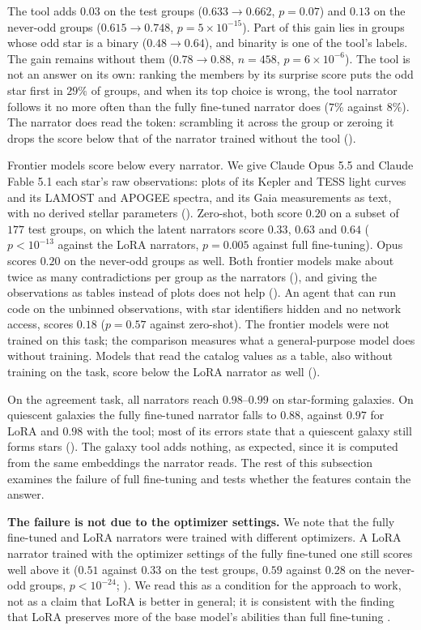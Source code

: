 The tool adds $0.03$ on the test groups ($0.633 \to 0.662$, $p=0.07$) and $0.13$ on the
never-odd groups ($0.615 \to 0.748$, $p=5\times10^{-15}$). Part of this gain lies in groups
whose odd star is a binary ($0.48 \to 0.64$), and binarity is one of the tool's labels. The
gain remains without them ($0.78 \to 0.88$, $n=458$, $p=6\times10^{-6}$). The tool is not an
answer on its own: ranking the members by its surprise score puts the odd star first in $29\%$
of groups, and when its top choice is wrong, the tool narrator follows it no more often than
the fully fine-tuned narrator does ($7\%$ against $8\%$). The narrator does read the token:
scrambling it across the group or zeroing it drops the score below that of the narrator trained
without the tool ().

Frontier models score below every narrator. We give Claude Opus 5.5 and Claude Fable 5.1 each
star's raw observations: plots of its Kepler and TESS light curves and its LAMOST and APOGEE
spectra, and its Gaia measurements as text, with no derived stellar parameters
(). Zero-shot, both score $0.20$ on a subset of $177$ test groups, on which
the latent narrators score $0.33$, $0.63$ and $0.64$ ($p<10^{-13}$ against the LoRA narrators,
$p=0.005$ against full fine-tuning). Opus scores $0.20$ on the never-odd groups as well. Both
frontier models make about twice as many contradictions per group as the narrators
(), and giving the observations as tables instead of plots does not help
(). An agent that can run code on the unbinned observations, with star
identifiers hidden and no network access, scores $0.18$ ($p=0.57$ against zero-shot). The
frontier models were not trained on this task; the comparison measures what a general-purpose
model does without training. Models that read the catalog values as a table, also without
training on the task, score below the LoRA narrator as well ().

On the agreement task, all narrators reach
$0.98$--$0.99$ on star-forming galaxies. On quiescent galaxies the fully fine-tuned narrator
falls to $0.88$, against $0.97$ for LoRA and $0.98$ with the tool; most of its errors state
that a quiescent galaxy still forms stars (). The galaxy tool adds nothing, as
expected, since it is computed from the same embeddings the narrator reads. The rest of this subsection
examines the failure of full fine-tuning and tests whether the features contain the answer.

\textbf{The failure is not due to the optimizer settings.} We note that the fully fine-tuned and LoRA narrators were trained with different optimizers.
 A LoRA narrator trained with the optimizer settings
of the fully fine-tuned one still scores well above it ($0.51$ against $0.33$ on the test
groups, $0.59$ against $0.28$ on the never-odd groups, $p<10^{-24}$; ).
We read this as a condition for the approach to work, not as a claim that LoRA is better in
general; it is consistent with the finding that LoRA preserves more of the base model's
abilities than full fine-tuning \citep{Biderman2024_lora}.

